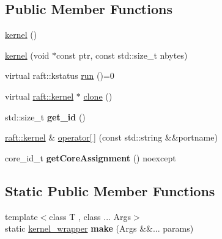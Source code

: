 \subsection*{Public Member Functions}
\begin{DoxyCompactItemize}
\item 
\hyperlink{classraft_1_1kernel_a57aa6c7842f594d1522fb1c127fc4588}{kernel} ()
\item 
\hyperlink{classraft_1_1kernel_a8c275f04f04b99d77fc4639a053112c8}{kernel} (void $\ast$const ptr, const std\+::size\+\_\+t nbytes)
\item 
virtual raft\+::kstatus \hyperlink{classraft_1_1kernel_a05094286d7577360fb1b91c91fc05901}{run} ()=0
\item 
virtual \hyperlink{classraft_1_1kernel}{raft\+::kernel} $\ast$ \hyperlink{classraft_1_1kernel_a71bfffbbb3d40949e19be32e3d8f467f}{clone} ()
\item 
\hypertarget{classraft_1_1kernel_a2376ee5c5d413955db3f017fb707a6df}{}\label{classraft_1_1kernel_a2376ee5c5d413955db3f017fb707a6df} 
std\+::size\+\_\+t {\bfseries get\+\_\+id} ()
\item 
\hyperlink{classraft_1_1kernel}{raft\+::kernel} \& \hyperlink{classraft_1_1kernel_a186ea784c5b1ac8fd90f2112c1c62675}{operator\mbox{[}$\,$\mbox{]}} (const std\+::string \&\&portname)
\item 
\hypertarget{classraft_1_1kernel_aafd70e8e6ff6137db295e8dd0388b77d}{}\label{classraft_1_1kernel_aafd70e8e6ff6137db295e8dd0388b77d} 
core\+\_\+id\+\_\+t {\bfseries get\+Core\+Assignment} () noexcept
\end{DoxyCompactItemize}
\subsection*{Static Public Member Functions}
\begin{DoxyCompactItemize}
\item 
\hypertarget{classraft_1_1kernel_aebbcef35d4e08abbbe4167c2b75fab5f}{}\label{classraft_1_1kernel_aebbcef35d4e08abbbe4167c2b75fab5f} 
{\footnotesize template$<$class T , class ... Args$>$ }\\static \hyperlink{classraft_1_1kernel__wrapper}{kernel\+\_\+wrapper} {\bfseries make} (Args \&\&... params)
\end{DoxyCompactItemize}
